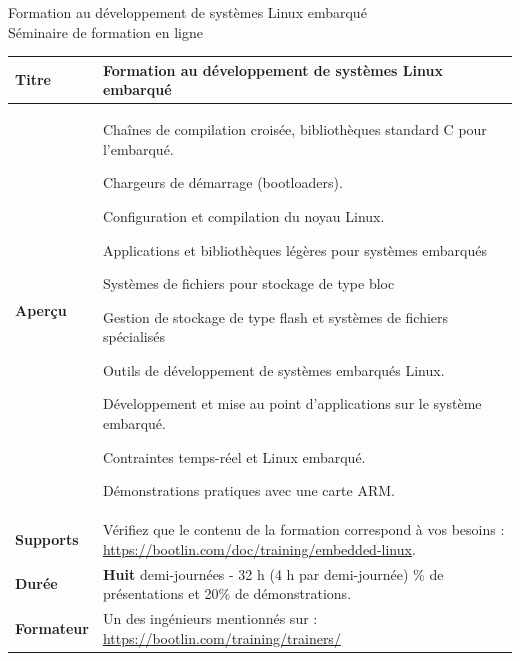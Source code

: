 \documentclass[a4paper,12pt,obeyspaces,spaces,hyphens]{article}
\begin{document}
\thispagestyle{fancy}

\setlength{\arrayrulewidth}{0.8pt}

\begin{center}
\LARGE
Formation au développement de systèmes Linux embarqué\\
\large
Séminaire de formation en ligne
\end{center}
\vspace{1cm}

\small
{}

 {
  \begin{tabularx}{\textwidth}{|g|h|}
    {\bf Titre} & {\bf Formation au développement de systèmes Linux embarqué} \\
    \hline

    {\bf Aperçu} &
Chaînes de compilation croisée, bibliothèques standard C pour l'embarqué. \par
Chargeurs de démarrage (bootloaders). \par
Configuration et compilation du noyau Linux. \par
Applications et bibliothèques légères pour systèmes embarqués \par
Systèmes de fichiers pour stockage de type bloc \par
Gestion de stockage de type flash et systèmes de fichiers spécialisés \par
Outils de développement de systèmes embarqués Linux. \par
Développement et mise au point d'applications sur le système embarqué. \par
Contraintes temps-réel et Linux embarqué. \par
Démonstrations pratiques avec une carte ARM. \\
    \hline
    {\bf Supports} &
    Vérifiez que le contenu de la formation correspond à vos besoins :
    \newline \url{https://bootlin.com/doc/training/embedded-linux}. \\
    \hline

    {\bf Durée} & {\bf Huit} demi-journées - 32 h (4 h par demi-journée)
    \% de présentations et 20\% de démonstrations. \\
    \hline

    {\bf Formateur} & Un des ingénieurs mentionnés sur :
    \newline \url{https://bootlin.com/training/trainers/}\\
    \hline


\end{tabularx}}
\end{document}
